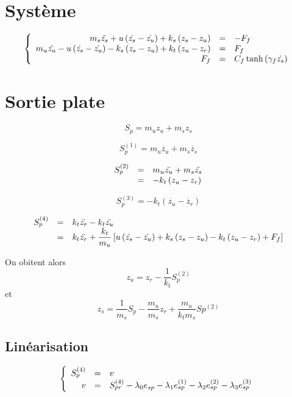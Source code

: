 \documentclass[10pt]{article}
\begin{document}
\section{Système}

\[
\left\{
\begin{array}{r c l}
  m_s \ddot{z_s} + u \left( \dot{z_s} - \dot{z_u} \right) + k_s \left( z_s - z_u \right) & = & - F_f \\
  m_u \ddot{z_u} - u \left( \dot{z_s} - \dot{z_u} \right) - k_s \left( z_s - z_u \right) + k_t \left( z_u - z_r \right) & = & F_f \\
  F_f & = & C_f \tanh\left(\gamma_f \dot{z_s} \right) \\
\end{array}
\right.
\]

\section{Sortie plate}
\[
S_p = m_u z_u + m_s z_s
\]

\[
S_p^{(1)} = m_u \dot{z_u} + m_s \dot{z_s}
\]

\[
\begin{array}{r c l}
  S_p^{(2)} &=& m_u \ddot{z_u} + m_s \ddot{z_s} \\
  &=& - k_t \left( z_u - z_r \right) \\
\end{array}
\]

\[
S_p^{(3)} = - k_t \left( \dot{z_u} - \dot{z_r} \right)
\]

\[
\begin{array}{r c l}
  S_p^{(4)} &=& k_t \ddot{z_r} - k_t \ddot{z_u} \\
  &=& k_t \ddot{z_r} + \dfrac{k_t}{m_u} \left[ u \left( \dot{z_s} - \dot{z_u} \right) + k_s \left( z_s - z_u \right) - k_t \left( z_u - z_r \right) + F_f \right] \\
\end{array}
\]

On obitent alors
\[
z_u = z_r - \dfrac{1}{k_t} S_p^{(2)}
\]
et
\[
z_s = \dfrac{1}{m_s} S_p - \dfrac{m_u}{m_s} z_r + \dfrac{m_u}{k_t m_s} Sp^{(2)}
\]

\subsection{Linéarisation}

\[
\left\{
\begin{array}{r c l}
S_p^{(4)} &=& v \\
v &=& S_{pr}^{(4)} - \lambda_0 e_{sp} - \lambda_1 e_{sp}^{(1)} - \lambda_2 e_{sp}^{(2)} - \lambda_3 e_{sp}^{(3)} \\
\end{array}
\right.
\]
\end{document}
